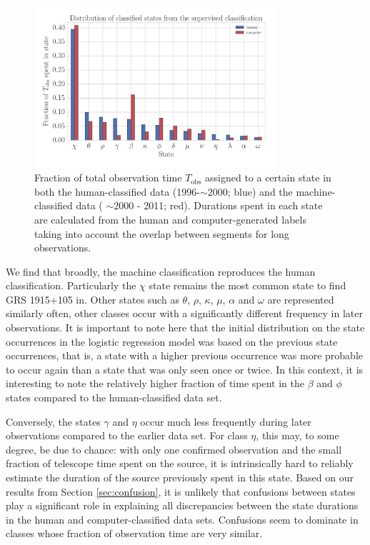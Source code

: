 \documentclass[fleqn,usenatbib]{mnras}
\begin{document}
\begin{figure}
\begin{center}
\includegraphics[width=9cm]{grs1915_supervised_states_histogram.pdf}
\caption{Fraction of total observation time $T_\mathrm{obs}$ assigned to a certain state in both the human-classified data (1996-$\sim\!\! 2000$; blue) and the machine-classified data ( $\sim\!\! 2000$ - 2011; red). Durations spent in each state are calculated from the human and computer-generated labels taking into 
account the overlap between segments for long observations.} 
\label{fig:state_durations}
\end{center}
\end{figure}

We find that broadly, the machine classification reproduces the human classification. Particularly the $\chi$ state remains the most common state to find GRS 1915+105 in. Other states such as $\theta$, $\rho$, $\kappa$, $\mu$, $\alpha$ and $\omega$ are represented similarly often, other classes occur with a significantly different frequency in later observations. It is important to note here that the initial distribution on the state occurrences in the logistic regression model was based on the previous state occurrences, that is, a state with a higher previous occurrence was more probable to occur again than a state that was only seen once or twice. In this context, it is interesting to note the relatively higher fraction of time spent in the $\beta$ and $\phi$ states compared to the human-classified data set.

Conversely, the states $\gamma$ and $\eta$ occur much less frequently during later observations compared to the earlier data set. For class $\eta$, this may, to some degree, be due to chance: with only one confirmed observation and the small fraction of telescope time spent on the source, it is intrinsically hard to reliably estimate the duration of the source previously spent in this state. 
Based on our results from Section \ref{sec:confusion}, it is unlikely that confusions between states play a significant role in explaining all discrepancies between the state durations in the human and computer-classified data sets. Confusions seem to dominate in classes whose fraction of observation time are very similar.
\end{document}
